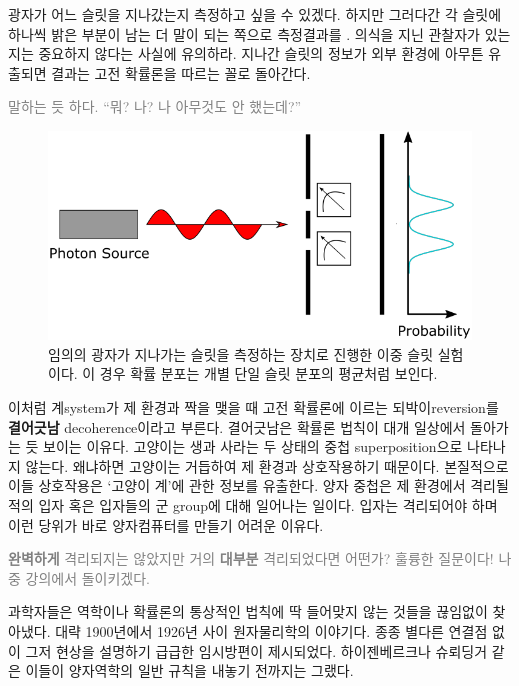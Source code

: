 \documentclass[a4paper,chapter,kosection,atbegshi,hidelinks,itemph]{oblivoir}
\begin{document}
\newpage

광자가 어느 슬릿을 지나갔는지 측정하고 싶을 수 있겠다. 하지만 그러다간 각 슬릿에
하나씩 밝은 부분이 남는 더 말이 되는 쪽으로 측정결과를 . 
의식을 지닌 관찰자가 있는지는 중요하지 않다는 사실에 유의하라. 지나간 슬릿의
정보가 외부 환경에 아무튼 유출되면 결과는 고전 확률론을 따르는 꼴로 돌아간다. 

\hfill

\hfill\parbox[t]{9cm}{\textcolor{gray}{ 말하는 듯 하다. ``뭐? 나? 나 아무것도 안 했는데?''}}

\hfill

\begin{figure}[h]
  \centering
  \includegraphics[width=.8\textwidth]{iqis1_007}
  \caption{\label{fig:figure24}임의의 광자가 지나가는 슬릿을 측정하는 장치로
    진행한 이중 슬릿 실험이다. 이 경우 확률 분포는 개별 단일 슬릿 분포의 평균처럼
  보인다.}
\end{figure}

이처럼 계{\footnotesize system}가 제 환경과 짝을 맺을 때 고전 확률론에 이르는
되박이{\footnotesize reversion}를 \textbf{결어긋남}{\footnotesize
decoherence}이라고 부른다. 결어긋남은 확률론 법칙이 대개 일상에서 돌아가는 듯
보이는 이유다. 고양이는 생과 사라는 두 상태의 중첩{\footnotesize
superposition}으로 나타나지 않는다. 왜냐하면 고양이는 거듭하여 제 환경과
상호작용하기 때문이다. 본질적으로 이들 상호작용은 `고양이 계'에 관한 정보를
유출한다. 양자 중첩은 제 환경에서 격리될 적의 입자 혹은 입자들의 군{\footnotesize
group}에 대해 일어나는 일이다. 입자는 격리되어야 하며 이런 당위가 바로
양자컴퓨터를 만들기 어려운 이유다.

\hfill

\hfill\parbox[t]{9cm}{\textcolor{gray}{ \textbf{완벽하게}
격리되지는 않았지만 거의 \textbf{대부분} 격리되었다면 어떤가? 훌륭한 질문이다!
나중 강의에서 돌이키겠다.}}

\hfill\break

과학자들은 역학이나 확률론의 통상적인 법칙에 딱 들어맞지 않는 것들을 끊임없이
찾아냈다. 대략 1900년에서 1926년 사이 원자물리학의 이야기다. 종종 별다른 연결점
없이 그저 현상을 설명하기 급급한 임시방편이 제시되었다. 하이젠베르크나 슈뢰딩거
같은 이들이 양자역학의 일반 규칙을 내놓기 전까지는 그랬다. 
\end{document}
